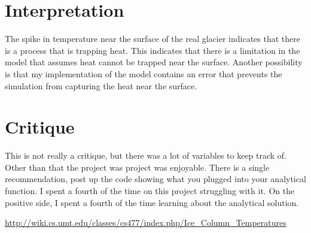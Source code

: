 \documentclass{article}%
\begin{document}
    \section{Interpretation}
    The spike in temperature near the surface of the real glacier indicates that there is a process 
    that is trapping heat. This indicates that there is a limitation in the model that assumes heat cannot be trapped near the surface. Another possibility is that my implementation of the model contains an error that prevents the simulation from capturing the heat near the surface. 

    \section{Critique} 
    This is not really a critique, but there was a lot of variables to keep track of. Other than that the project was project was enjoyable. There is a single recommendation, post up the code showing what you plugged into your analytical function. I spent a fourth of the time on this project struggling with it. On the positive side, I spent a fourth of the time learning about the analytical solution.  

    \begin{thebibliography}{1}
        \url{http://wiki.cs.umt.edu/classes/cs477/index.php/Ice\_Column\_Temperatures}
    \end{thebibliography} 
\end{document}
